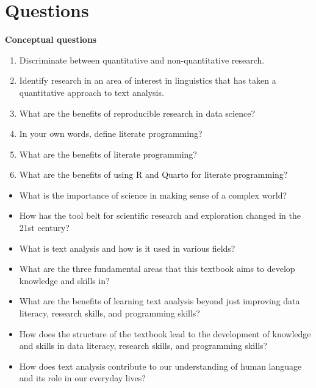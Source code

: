 \documentclass[
  letterpaper,
]{latex/krantz}
\providecommand{\tightlist}{%
  \setlength{\itemsep}{0pt}\setlength{\parskip}{0pt}}\usepackage{longtable,booktabs,array}
\begin{document}
\hypertarget{questions-1}{%
\section*{Questions}\label{questions-1}}


\begin{tcolorbox}[enhanced jigsaw, left=2mm, arc=.35mm, colback=white, rightrule=.15mm, toprule=.15mm, breakable, leftrule=.75mm, opacityback=0, bottomrule=.15mm]

\textbf{Conceptual questions}

\begin{enumerate}
\def\labelenumi{\arabic{enumi}.}
\tightlist
\item
  Discriminate between quantitative and non-quantitative research.
\item
  Identify research in an area of interest in linguistics that has taken
  a quantitative approach to text analysis.
\item
  What are the benefits of reproducible research in data science?
\item
  In your own words, define literate programming?
\item
  What are the benefits of literate programming?
\item
  What are the benefits of using R and Quarto for literate programming?
\end{enumerate}

\begin{itemize}
\tightlist
\item
  What is the importance of science in making sense of a complex world?
\item
  How has the tool belt for scientific research and exploration changed
  in the 21st century?
\item
  What is text analysis and how is it used in various fields?
\item
  What are the three fundamental areas that this textbook aims to
  develop knowledge and skills in?
\item
  What are the benefits of learning text analysis beyond just improving
  data literacy, research skills, and programming skills?
\item
  How does the structure of the textbook lead to the development of
  knowledge and skills in data literacy, research skills, and
  programming skills?
\item
  How does text analysis contribute to our understanding of human
  language and its role in our everyday lives?
\end{itemize}

\end{tcolorbox}
\end{document}
